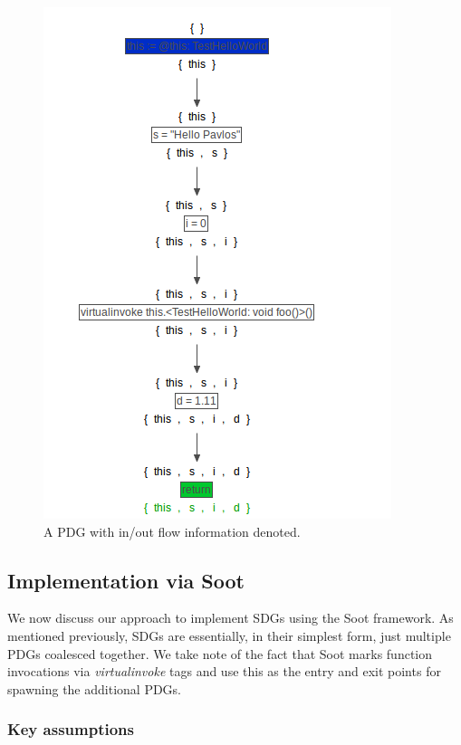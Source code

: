 \documentclass[authoryear,preprint]{sigplanconf}
\begin{document}
\begin{figure}[ht]
	\centering
	\includegraphics[width=.9\linewidth]{figures/Selection_080}
	\caption[A PDG with in/out flow information denoted.]{\label{f:sampInOut}A PDG with in/out flow information denoted.}
\end{figure}

\subsection{Implementation via Soot}

We now discuss our approach to implement SDGs using the Soot framework. As mentioned previously, SDGs are essentially, in their simplest form, just multiple PDGs coalesced together. We take note of the fact that Soot marks function invocations via \textit{virtualinvoke} tags and use this as the entry and exit points for spawning the additional PDGs.

\subsubsection{Key assumptions}
\end{document}
